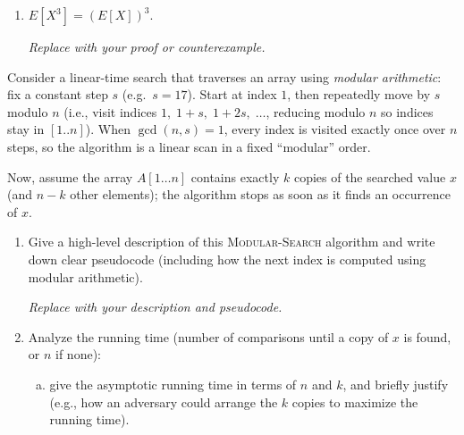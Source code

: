 \documentclass[dvipsnames]{article}
\begin{document}
\begin{problem}
\begin{enumerate}
\color{black}\noindent
    \item \(E[X^3] = (E[X])^3\).

\color{purple}
\begin{mdframed}
  \color{purple}
  \emph{Replace with your proof or counterexample.}
\end{mdframed}

  \end{enumerate}
\end{problem}

\newpage\color{black}
\begin{problem}
  Consider a linear-time search that traverses an array using \emph{modular arithmetic}: fix a constant step \(s\) (e.g.\ \(s = 17\)).
  Start at index \(1\), then repeatedly move by \(s\) modulo \(n\) (i.e., visit indices \(1,\; 1+s,\; 1+2s,\; \dots\), reducing modulo \(n\) so indices stay in \([1..n]\)).
  When \(\gcd(n,s) = 1\), every index is visited exactly once over \(n\) steps,
  so the algorithm is a linear scan in a fixed ``modular'' order.

  Now, assume the array \(A[1 \dots n]\) contains exactly \(k\) copies of the searched value \(x\) (and \(n - k\) other elements);
  the algorithm stops as soon as it finds an occurrence of \(x\).

  \begin{enumerate}
    \item Give a high-level description of this \textsc{Modular-Search} algorithm and write down clear pseudocode
    (including how the next index is computed using modular arithmetic).

\color{purple}
\begin{mdframed}
  \color{purple}
  \emph{Replace with your description and pseudocode.}
\end{mdframed}

\color{black}\noindent
    \item Analyze the running time (number of comparisons until a copy of \(x\) is found, or \(n\) if none):
      \begin{enumerate}[(a)]
        \item[\textbf{worst-case}:] give the asymptotic running time in terms of \(n\) and \(k\), and briefly justify
        (e.g., how an adversary could arrange the \(k\) copies to maximize the running time).


\end{enumerate}
\end{enumerate}
\end{problem}
\end{document}
